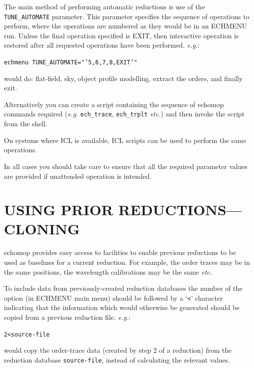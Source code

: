 \documentclass[11pt,twoside]{article}
\makeatletter
\newcommand{\stardocinitials}  {SUN}
\newcommand{\stardocnumber}    {152.4}
\newcommand{\stardocname}{\stardocinitials /\stardocnumber}
\newcommand{\htmlref}[2]{#1}
\newcommand{\xref}[3]{#1}
\newcommand{\xlabel}[1]{}
\newcommand{\mlabel}[1]{\xlabel{#1}\label{#1}}
\newcommand{\myindex}[1]{\index{#1}}
\newcommand{\indexcmdname}[1]{\index{#1@\protect\cmdname{#1}}}
\renewcommand{\myindex}[1]{}
\renewcommand{\indexcmdname}[1]{}
\newcommand{\cmdname}{\begingroup \catcode`\_=12 \realcmdname}
\newcommand{\realcmdname}[1]{\endgroup\texttt{#1}}
\makeatother
\begin{document}
\myindex{Batch processing}
The main method of performing automatic reductions is use of the
\htmlref{{\tt{TUNE\_AUTOMATE}}}{par_TUNE_AUTOMATE} parameter.
This parameter
specifies the sequence of operations to perform, where the operations
are numbered as they would be in an ECHMENU run.  Unless the final
operation specified is EXIT, then interactive operation is restored
after all requested operations have been performed. {\it{e.g.}}:
\indexcmdname{TUNE_AUTOMATE}

\texttt{echmenu TUNE\_AUTOMATE="'5,6,7,8,EXIT'"}

would do: flat-field, sky, object profile modelling, extract the orders,
and finally exit.

Alternatively you can create a script containing the sequence of {\sc echomop}
commands required ({\it{e.g.}} \htmlref{{\tt ech\_trace}}{ech_trace},
\htmlref{{\tt ech\_trplt}}{ech_trplt} {\it etc.}) and then invoke
the script from the shell.

On systems where \xref{ICL}{sg5}{} is available, ICL scripts can be used to
perform the same operations.

In all cases you should take care to ensure that all the required parameter
values are provided if unattended operation is intended.


\section{\mlabel{cloning}USING PRIOR REDUCTIONS---CLONING}
\markboth{Cloning}{\stardocname}
\myindex{Cloning}
\myindex{Using data from previous reduction}
\myindex{Reduction database!cloning}

{\sc echomop} provides easy access to facilities to enable previous
reductions to be used as baselines for a current reduction. For
example, the order traces may be in the same positions, the
wavelength calibrations may be the same {\it etc.}

To include data from previously-created reduction databases the number
of the option (in ECHMENU main menu) should be followed by a `\texttt{<}'
character indicating that the information which would otherwise be
generated should be copied from a previous reduction file. {\it{e.g.}}:

\texttt{2<source-file}

would copy the order-trace data (created by step 2 of a reduction) from the
reduction database \texttt{source-file}, instead of calculating the relevant
values.
\end{document}
